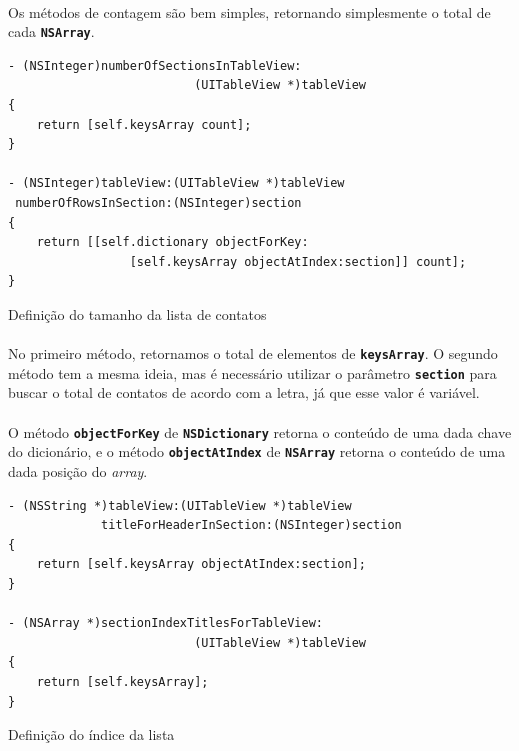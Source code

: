 \documentclass[a4paper,12pt,brazil,doubleside]{book}
\begin{document}
\begin{singlespace}
\paragraph{}Os métodos de contagem são bem simples, retornando simplesmente o total de cada \texttt{\textbf{NSArray}}.

\begin{listing}[H]
\begin{verbatim}
- (NSInteger)numberOfSectionsInTableView:
                          (UITableView *)tableView
{
    return [self.keysArray count];
}

- (NSInteger)tableView:(UITableView *)tableView
 numberOfRowsInSection:(NSInteger)section
{
    return [[self.dictionary objectForKey:
                 [self.keysArray objectAtIndex:section]] count];
}
\end{verbatim}
\caption{Definição do tamanho da lista de contatos}
\end{listing}

\paragraph{}No primeiro método, retornamos o total de elementos de \texttt{\textbf{keysArray}}. O segundo método tem a mesma ideia, mas é necessário utilizar o parâmetro \texttt{\textbf{section}} para buscar o total de contatos de acordo com a letra, já que esse valor é variável.
\paragraph{}O método \texttt{\textbf{objectForKey}} de \texttt{\textbf{NSDictionary}} retorna o conteúdo de uma dada chave do dicionário, e o método \texttt{\textbf{objectAtIndex}} de \texttt{\textbf{NSArray}} retorna o conteúdo de uma dada posição do \emph{array}.

\begin{listing}[H]
\begin{verbatim}
- (NSString *)tableView:(UITableView *)tableView
             titleForHeaderInSection:(NSInteger)section
{
    return [self.keysArray objectAtIndex:section];
}

- (NSArray *)sectionIndexTitlesForTableView:
                          (UITableView *)tableView
{    
    return [self.keysArray];
}
\end{verbatim}
\caption{Definição do índice da lista}
\end{listing}


\end{singlespace}
\end{document}
